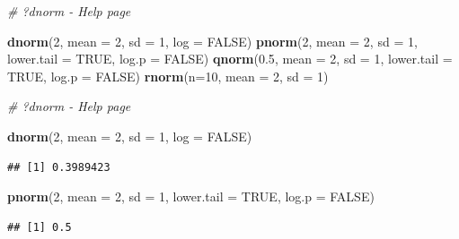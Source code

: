 \documentclass[]{book}
\newenvironment{Shaded}{\begin{snugshade}}{\end{snugshade}}
\newcommand{\CommentTok}[1]{\textcolor[rgb]{0.56,0.35,0.01}{\textit{#1}}}
\newcommand{\DataTypeTok}[1]{\textcolor[rgb]{0.13,0.29,0.53}{#1}}
\newcommand{\DecValTok}[1]{\textcolor[rgb]{0.00,0.00,0.81}{#1}}
\newcommand{\FloatTok}[1]{\textcolor[rgb]{0.00,0.00,0.81}{#1}}
\newcommand{\KeywordTok}[1]{\textcolor[rgb]{0.13,0.29,0.53}{\textbf{#1}}}
\newcommand{\NormalTok}[1]{#1}
\newcommand{\OtherTok}[1]{\textcolor[rgb]{0.56,0.35,0.01}{#1}}
\begin{document}
\begin{Shaded}
\begin{Highlighting}[]
\CommentTok{# ?dnorm - Help page}

\KeywordTok{dnorm}\NormalTok{(}\DecValTok{2}\NormalTok{, }\DataTypeTok{mean =} \DecValTok{2}\NormalTok{, }\DataTypeTok{sd =} \DecValTok{1}\NormalTok{, }\DataTypeTok{log =} \OtherTok{FALSE}\NormalTok{)}
\KeywordTok{pnorm}\NormalTok{(}\DecValTok{2}\NormalTok{, }\DataTypeTok{mean =} \DecValTok{2}\NormalTok{, }\DataTypeTok{sd =} \DecValTok{1}\NormalTok{, }\DataTypeTok{lower.tail =} \OtherTok{TRUE}\NormalTok{, }\DataTypeTok{log.p =} \OtherTok{FALSE}\NormalTok{)}
\KeywordTok{qnorm}\NormalTok{(}\FloatTok{0.5}\NormalTok{, }\DataTypeTok{mean =} \DecValTok{2}\NormalTok{, }\DataTypeTok{sd =} \DecValTok{1}\NormalTok{, }\DataTypeTok{lower.tail =} \OtherTok{TRUE}\NormalTok{, }\DataTypeTok{log.p =} \OtherTok{FALSE}\NormalTok{)}
\KeywordTok{rnorm}\NormalTok{(}\DataTypeTok{n=}\DecValTok{10}\NormalTok{, }\DataTypeTok{mean =} \DecValTok{2}\NormalTok{, }\DataTypeTok{sd =} \DecValTok{1}\NormalTok{)}
\end{Highlighting}
\end{Shaded}

\begin{Shaded}
\begin{Highlighting}[]
\CommentTok{# ?dnorm - Help page}

\KeywordTok{dnorm}\NormalTok{(}\DecValTok{2}\NormalTok{, }\DataTypeTok{mean =} \DecValTok{2}\NormalTok{, }\DataTypeTok{sd =} \DecValTok{1}\NormalTok{, }\DataTypeTok{log =} \OtherTok{FALSE}\NormalTok{)}
\end{Highlighting}
\end{Shaded}

\begin{verbatim}
## [1] 0.3989423
\end{verbatim}

\begin{Shaded}
\begin{Highlighting}[]
\KeywordTok{pnorm}\NormalTok{(}\DecValTok{2}\NormalTok{, }\DataTypeTok{mean =} \DecValTok{2}\NormalTok{, }\DataTypeTok{sd =} \DecValTok{1}\NormalTok{, }\DataTypeTok{lower.tail =} \OtherTok{TRUE}\NormalTok{, }\DataTypeTok{log.p =} \OtherTok{FALSE}\NormalTok{)}
\end{Highlighting}
\end{Shaded}

\begin{verbatim}
## [1] 0.5
\end{verbatim}
\end{document}
